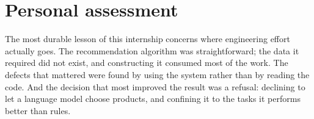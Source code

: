 \clearpage

\section*{Personal assessment}

The most durable lesson of this internship concerns where engineering effort
actually goes. The recommendation algorithm was straightforward; the data it
required did not exist, and constructing it consumed most of the work. The
defects that mattered were found by using the system rather than by reading the
code. And the decision that most improved the result was a refusal: declining to
let a language model choose products, and confining it to the tasks it performs
better than rules.

\clearpage
